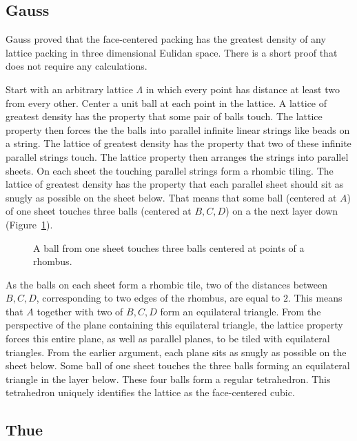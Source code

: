 \subsection{Gauss}

Gauss proved that the face-centered packing has the greatest density
of any lattice packing in three dimensional Eulidan space.  
There is a short proof that
does not require any calculations.

Start with an arbitrary lattice $\Lambda$ in which every point has
distance at least two from every other.  Center a unit ball at each
point in the lattice.  A lattice of greatest density has the property that some pair of balls touch.  The lattice property
then forces the the balls into parallel infinite linear strings
like beads on a string.  The lattice of greatest
density has the property that two of these 
infinite parallel strings touch.  The lattice property then arranges the strings into parallel sheets.  On each sheet the touching parallel
strings form a rhombic tiling.  The lattice of greatest density
has the property that each parallel sheet should sit
as snugly as possible on the sheet below.  That means that some ball (centered at $A$) of
one sheet touches three balls (centered at $B,C,D$) 
on a the next layer down (Figure~\ref{fig:rhombus}).

\begin{figure}[htb]
  \centering
  \caption{A ball from one sheet touches three balls centered at points of a rhombus.}
  \label{fig:rhombus}
\end{figure}

As the balls on each sheet form a rhombic tile, two of the distances
between $B,C,D$, corresponding to two edges of the rhombus, 
are equal to $2$.  This means that $A$ together with
two of $B,C,D$ form an equilateral triangle.  From the perspective of the plane
containing this equilateral triangle, the lattice property forces this entire
plane, as well as parallel planes, to be tiled with equilateral triangles.
From the earlier argument, each plane sits as snugly as possible on
the sheet below.  Some ball of one sheet touches the three balls forming
an equilateral triangle in the layer below.  These four balls form a regular
tetrahedron.  This tetrahedron 
uniquely identifies the lattice as the face-centered cubic.






\subsection{Thue}\label{sec:thue}



